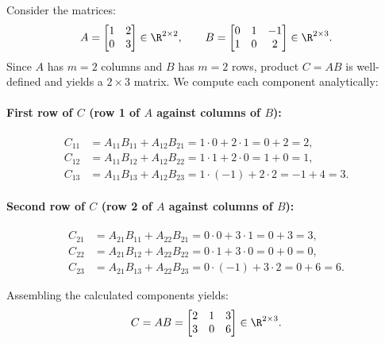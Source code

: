 \begin{example}
Consider the matrices:
\begin{equation}
    A = \begin{bmatrix} 1 & 2 \\ 0 & 3 \end{bmatrix} \in \R^{2 \times 2}, \qquad B = \begin{bmatrix} 0 & 1 & -1 \\ 1 & 0 & 2 \end{bmatrix} \in \R^{2 \times 3}.
\end{equation}
Since $A$ has $m = 2$ columns and $B$ has $m = 2$ rows, product $C = AB$ is well-defined and yields a $2 \times 3$ matrix. We compute each component analytically:

\paragraph{First row of $C$ (row 1 of $A$ against columns of $B$):}
\begin{align}
    C_{11} &= A_{11}B_{11} + A_{12}B_{21} = 1 \cdot 0 + 2 \cdot 1 = 0 + 2 = 2, \\
    C_{12} &= A_{11}B_{12} + A_{12}B_{22} = 1 \cdot 1 + 2 \cdot 0 = 1 + 0 = 1, \\
    C_{13} &= A_{11}B_{13} + A_{12}B_{23} = 1 \cdot (-1) + 2 \cdot 2 = -1 + 4 = 3.
\end{align}

\paragraph{Second row of $C$ (row 2 of $A$ against columns of $B$):}
\begin{align}
    C_{21} &= A_{21}B_{11} + A_{22}B_{21} = 0 \cdot 0 + 3 \cdot 1 = 0 + 3 = 3, \\
    C_{22} &= A_{21}B_{12} + A_{22}B_{22} = 0 \cdot 1 + 3 \cdot 0 = 0 + 0 = 0, \\
    C_{23} &= A_{21}B_{13} + A_{22}B_{23} = 0 \cdot (-1) + 3 \cdot 2 = 0 + 6 = 6.
\end{align}

Assembling the calculated components yields:
\begin{equation}
    C = AB = \begin{bmatrix} 2 & 1 & 3 \\ 3 & 0 & 6 \end{bmatrix} \in \R^{2 \times 3}.
\end{equation}
\end{example}

